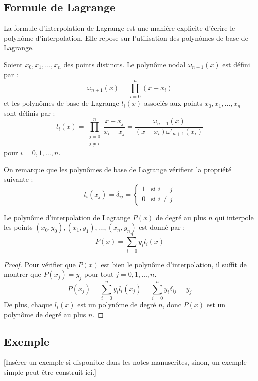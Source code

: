 \documentclass[oneside]{book}
\begin{document}
\subsection{Formule de Lagrange}

La formule d'interpolation de Lagrange est une manière explicite d'écrire le polynôme d'interpolation. Elle repose sur l'utilisation des polynômes de base de Lagrange.

\begin{definition}
Soient $x_0, x_1, \dots, x_n$ des points distincts. Le polynôme nodal $\omega_{n+1}(x)$ est défini par :
\[
\omega_{n+1}(x) = \prod_{i=0}^{n} (x - x_i)
\]
et les polynômes de base de Lagrange $l_i(x)$ associés aux points $x_0, x_1, \dots, x_n$ sont définis par :
\[
l_i(x) = \prod_{\substack{j=0 \\ j \neq i}}^{n} \frac{x - x_j}{x_i - x_j} = \frac{\omega_{n+1}(x)}{(x-x_i)\omega'_{n+1}(x_i)}
\]
pour $i = 0, 1, \dots, n$.
\end{definition}

On remarque que les polynômes de base de Lagrange vérifient la propriété suivante :
\[
l_i(x_j) = \delta_{ij} = \begin{cases} 1 & \text{si } i = j \\ 0 & \text{si } i \neq j \end{cases}
\]

\begin{proposition}
Le polynôme d'interpolation de Lagrange $P(x)$ de degré au plus $n$ qui interpole les points $(x_0, y_0), (x_1, y_1), \dots, (x_n, y_n)$ est donné par :
\[
P(x) = \sum_{i=0}^{n} y_i l_i(x)
\]
\end{proposition}

\begin{proof}
Pour vérifier que $P(x)$ est bien le polynôme d'interpolation, il suffit de montrer que $P(x_j) = y_j$ pour tout $j = 0, 1, \dots, n$.
\[
P(x_j) = \sum_{i=0}^{n} y_i l_i(x_j) = \sum_{i=0}^{n} y_i \delta_{ij} = y_j
\]
De plus, chaque $l_i(x)$ est un polynôme de degré $n$, donc $P(x)$ est un polynôme de degré au plus $n$.
\end{proof}

\subsection{Exemple}
[Insérer un exemple si disponible dans les notes manuscrites, sinon, un exemple simple peut être construit ici.]
\end{document}
